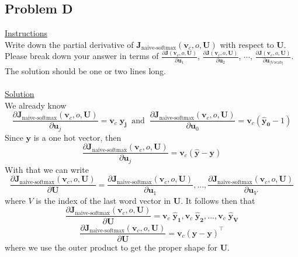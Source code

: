 \documentclass[12pt]{article}
\begin{document}
\subsection{Problem D}
\underline{Instructions}
~\\
Write down the partial derivative of $\bm J_{\text{naive-softmax}}(\bm v_c, o, \bm U)$ 
with respect to $\bm U$. Please break down your answer in terms of 
$\frac{\partial \bm J(\bm v_c, o, \bm U)}{\partial \bm u_1}$, 
$\frac{\partial \bm J(\bm v_c, o, \bm U)}{\partial \bm u_2}$, 
$\cdots$, $\frac{\partial \bm J(\bm v_c, o, \bm U)}{\partial \bm u_{|\text{Vocab}|}}$. 
The solution should be one or two lines long.
~\\
~\\
\underline{Solution}
~\\
We already know 
\begin{equation*}
    \frac{\partial \bm J_{\text{naive-softmax}}(\bm v_c, o, \bm U)}{\partial \bm u_j} = 
    \bm v_c \; \bm {\hat y_j} \; \; \text{and} \; \; 
    \frac{\partial \bm J_{\text{naive-softmax}}(\bm v_c, o, \bm U)}{\partial \bm u_0} = 
    \bm v_c ( \bm {\hat y_0} - 1 )
\end{equation*}
Since $\bm y$ is a one hot vector, then
\begin{equation*}
    \frac{\partial \bm J_{\text{naive-softmax}}(\bm v_c, o, \bm U)}{\partial \bm u_j} = 
    \bm v_c ( \bm {\hat y} - \bm y )
\end{equation*}
With that we can write
\begin{equation*}
    \frac{\partial \bm J_{\text{naive-softmax}}(\bm v_c, o, \bm U)}{\partial \bm U} = 
    \frac{\partial \bm J_{\text{naive-softmax}}(\bm v_c, o, \bm U)}{\partial \bm u_1}, ..., 
    \frac{\partial \bm J_{\text{naive-softmax}}(\bm v_c, o, \bm U)}{\partial \bm u_V}
\end{equation*}
where $V$ is the index of the last word vector in $\bm U$. It follows then that 
\begin{equation*}
    \frac{\partial \bm J_{\text{naive-softmax}}(\bm v_c, o, \bm U)}{\partial \bm U} = 
    \bm v_c \; \bm {\hat y_1}, 
    \bm v_c \; \bm {\hat y_2}
    , ..., 
    \bm v_c \; \bm {\hat y_V}
\end{equation*}
\begin{equation*}
    \frac{\partial \bm J_{\text{naive-softmax}}(\bm v_c, o, \bm U)}{\partial \bm U} = 
    \bm v_c ( \bm {\hat y} - \bm y )^\top
\end{equation*}
where we use the outer product to get the proper shape for $\bm U$. 
\end{document}
